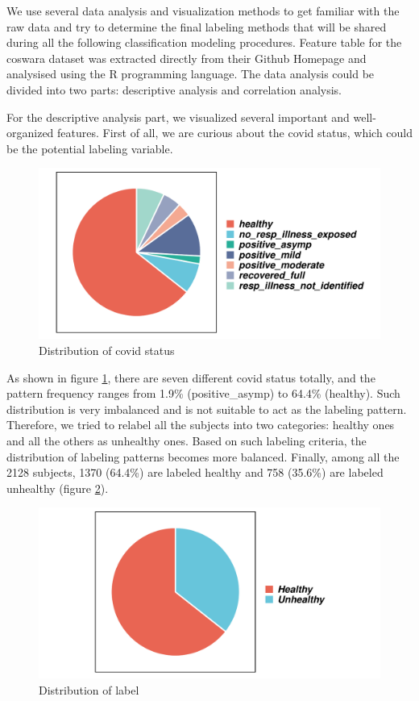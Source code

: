 \documentclass[11pt]{article}
\begin{document}
We use several data analysis and visualization methods to get familiar with the raw data and try to determine the final labeling methods that will be shared during all the following classification modeling procedures. Feature table for the coswara dataset was extracted directly from their Github Homepage and analysised using the R programming language. The data analysis could be divided into two parts: descriptive analysis and correlation analysis.

For the descriptive analysis part, we visualized several important and well-organized features. First of all, we are curious about the covid status, which could be the potential labeling variable.

\begin{figure}[!htbp]{}
    \centering
    \includegraphics[width=.8\textwidth]{./imgs/pie_covid_status.pdf} %
    \caption{Distribution of covid status}
    \label{fig:pie_covid_status}
\end{figure}

As shown in figure \ref{fig:pie_covid_status}, there are seven different covid status totally, and the pattern frequency ranges from 1.9\% (positive\_asymp) to 64.4\% (healthy). Such distribution is very imbalanced and is not suitable to act as the labeling pattern. Therefore, we tried to relabel all the subjects into two categories: healthy ones and all the others as unhealthy ones. Based on such labeling criteria, the distribution of labeling patterns becomes more balanced. Finally, among all the 2128 subjects, 1370 (64.4\%) are labeled healthy and 758 (35.6\%) are labeled unhealthy (figure \ref{fig:pie_label}).

\begin{figure}[htbp]{}
	\centering
    \includegraphics[width=.8\textwidth]{./imgs/pie_label.pdf} %
    \caption{Distribution of label}
    \label{fig:pie_label}
\end{figure}
\end{document}
